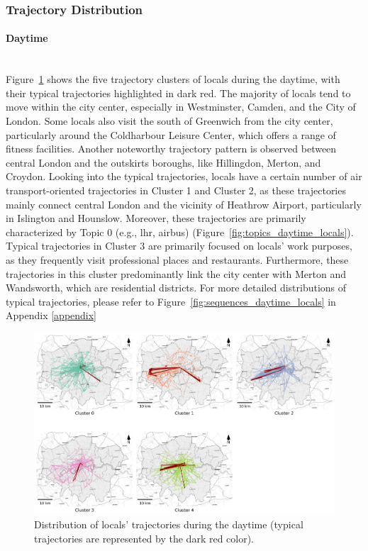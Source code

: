 \documentclass{article}
\newcommand{\subsubsubsection}[1]{\paragraph{#1}\mbox{}\\}
\theoremstyle{remark}
\begin{document}
\subsubsection{Trajectory Distribution} \label{traj_distribution}

\subsubsubsection{Daytime}

Figure~\ref{fig:traj_distribution_daytime_locals} shows the five trajectory clusters of locals during the daytime, with their typical trajectories highlighted in dark red. The majority of locals tend to move within the city center, especially in Westminster, Camden, and the City of London. Some locals also visit the south of Greenwich from the city center, particularly around the Coldharbour Leisure Center, which offers a range of fitness facilities. Another noteworthy trajectory pattern is observed between central London and the outskirts boroughs, like Hillingdon, Merton, and Croydon. Looking into the typical trajectories, locals have a certain number of air transport-oriented trajectories in Cluster 1 and Cluster 2, as these trajectories mainly connect central London and the vicinity of Heathrow Airport, particularly in Islington and Hounslow. Moreover, these trajectories are primarily characterized by Topic 0 (e.g., lhr, airbus) (Figure~\ref{fig:topics_daytime_locals}). Typical trajectories in Cluster 3 are primarily focused on locals' work purposes, as they frequently visit professional places and restaurants. Furthermore, these trajectories in this cluster predominantly link the city center with Merton and Wandsworth, which are residential districts. For more detailed distributions of typical trajectories, please refer to Figure~\ref{fig:sequences_daytime_locals} in Appendix \ref{appendix}

\begin{figure}[!h]
\centering
\includegraphics[width=1\textwidth]{figures/traj_distribution_daytime_locals.png}
\caption{\label{fig:traj_distribution_daytime_locals}Distribution of locals' trajectories during the daytime (typical trajectories are represented by the dark red color).}
\end{figure}
\end{document}
